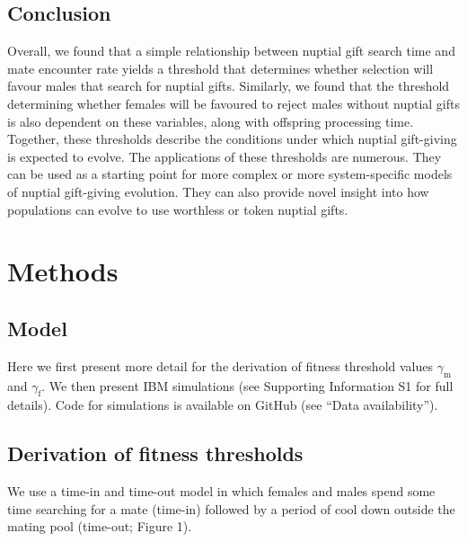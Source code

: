 \documentclass[
]{article}
\begin{document}
\hypertarget{conclusion}{%
\subsection{Conclusion}\label{conclusion}}

Overall, we found that a simple relationship between nuptial gift search
time and mate encounter rate yields a threshold that determines whether
selection will favour males that search for nuptial gifts. Similarly, we
found that the threshold determining whether females will be favoured to
reject males without nuptial gifts is also dependent on these variables,
along with offspring processing time. Together, these thresholds
describe the conditions under which nuptial gift-giving is expected to
evolve. The applications of these thresholds are numerous. They can be
used as a starting point for more complex or more system-specific models
of nuptial gift-giving evolution. They can also provide novel insight
into how populations can evolve to use worthless or token nuptial gifts.

\hypertarget{methods}{%
\section{Methods}\label{methods}}

\hypertarget{model}{%
\subsection{Model}\label{model}}

Here we first present more detail for the derivation of fitness
threshold values \(\gamma_{\mathrm{m}}\) and \(\gamma_{\mathrm{f}}\). We
then present IBM simulations (see Supporting Information S1 for full
details). Code for simulations is available on GitHub (see ``Data
availability'').

\hypertarget{derivation-of-fitness-thresholds}{%
\subsection{Derivation of fitness
thresholds}\label{derivation-of-fitness-thresholds}}

We use a time-in and time-out model in which females and males spend
some time searching for a mate (time-in) followed by a period of cool
down outside the mating pool (time-out; Figure 1).
\end{document}
